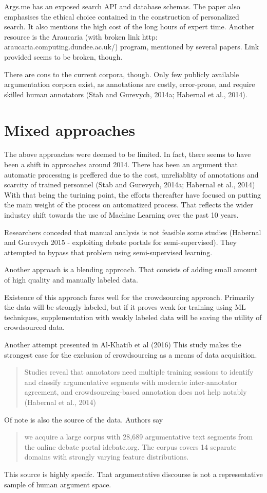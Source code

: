 \documentclass{report}
\begin{document}
{Args.me has an exposed search API and database schemas. The paper also emphasises the ethical choice contained in the construction of personalized search.
It also mentions the high cost of the long hours of expert time.
Another resource is the  Araucaria (with broken link  http:\\araucaria.computing.dundee.ac.uk/) program, mentioned by several papers. Link provided seems to be broken, though. 

There are cons to the current corpora, though.
Only few publicly available argumentation corpora exist, as annotations are costly, error-prone, and require skilled human annotators (Stab and Gurevych, 2014a; Habernal et al., 2014).

\section{Mixed approaches}
The above approaches were deemed to be limited. In fact, there seems to have been a shift in approaches around 2014.
There has been an argument that automatic processing is preffered due to the cost, unreliablity of annotations and scarcity of trained personnel
(Stab and Gurevych, 2014a; Habernal et al., 2014)
With that being the turining point, the efforts thereafter have focused on putting the main weight of the process on automatized process. 
That reflects the wider industry shift towards the use of Machine Learning over the past 10 years.

Researchers conceded that manual analysis is not feasible some studies (Habernal and Gurevych 2015 - exploiting debate portals for semi-supervised).
They attempted to bypass that problem using semi-supervised learning.

Another approach is a blending approach.\cite{shnarch_will_2018} That consists of adding small amount of high quality and manually labeled data.

Existence of this approach fares well for the crowdsourcing approach. Primarily the data will be strongly labeled, but if it proves weak for training using ML techniques, 
supplementation with weakly labeled data will be saving the utility of crowdsourced data.

Another attempt presented in Al-Khatib et al (2016) \cite{al-khatib_cross-domain_2016}
This study makes the strongest case for the exclusion of crowdsourcing as a means of data acquisition.
\begin{quote}
 Studies reveal that annotators need multiple training sessions to identify and classify argumentative segments with moderate inter-annotator agreement, and crowdsourcing-based annotation does not help notably (Habernal et al., 2014)
\end{quote}
Of note is also the source of the data. Authors say
\begin{quote}
 we acquire a large corpus with 28,689 argumentative text segments from the online debate portal idebate.org. The corpus covers 14 separate domains with strongly varying feature distributions.
\end{quote}
This source is highly specifc. That argumentative discourse is not a representative sample of human argument space.  

}
\end{document}
